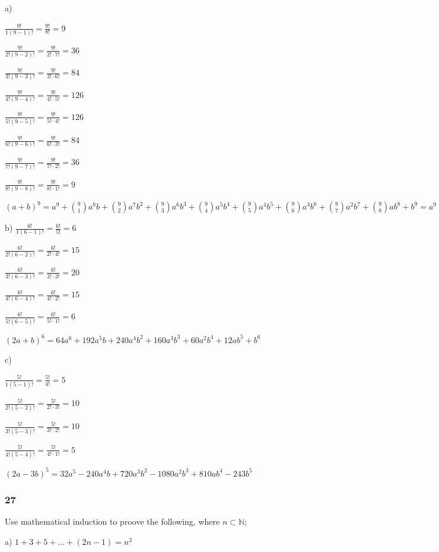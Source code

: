\documentclass[]{report}
\begin{document}
a)

$\frac{9!}{1(9-1)!} = \frac{9!}{8!} = 9$

$\frac{9!}{2!(9-2)!} = \frac{9!}{2! \cdot 7!} = 36$

$\frac{9!}{3!(9-3)!} = \frac{9!}{3! \cdot 6!} = 84$

$\frac{9!}{4!(9-4)!} = \frac{9!}{4! \cdot 5!} = 126$

$\frac{9!}{5!(9-5)!} = \frac{9!}{5! \cdot 4!} = 126$

$\frac{9!}{6!(9-6)!} = \frac{9!}{6! \cdot 3!} = 84$

$\frac{9!}{7!(9-7)!} = \frac{9!}{7! \cdot 2!} = 36$

$\frac{9!}{8!(9-8)!} = \frac{9!}{8! \cdot 1!} = 9$



 $(a+b)^9= a^9 + {9 \choose 1}a^8b + {9 \choose 2}a^7b^2 + {9 \choose 3}a^6b^3  +  {9 \choose 4}a^5b^4 + {9 \choose 5}a^4b^5+ {9 \choose 6}a^3b^6+ {9 \choose 7}a^2b^7+ {9 \choose 8}ab^8 +  b^9 = a^9 + 9a^8b + 36a^7b^2 + 84a^6b^3 +  126a^5b^4 + 126a^4b^5+ 84a^3b^6+ 36a^2b^7+ 9ab^8 +  b^9$

b) 
$\frac{6!}{1(6-1)!} = \frac{6!}{5!} = 6$

$\frac{6!}{2!(6-2)!} = \frac{6!}{2! \cdot 4!} = 15$

$\frac{6!}{3!(6-3)!} = \frac{6!}{3! \cdot 3!} = 20$

$\frac{6!}{4!(6-4)!} = \frac{6!}{4! \cdot 2!} = 15$

$\frac{6!}{5!(6-5)!} = \frac{6!}{5! \cdot 1!} = 6$

$(2a + b)^6  = 64a^6 + 192a^5b + 240a^4b^2 + 160a^3b^3 + 60a^2b^4 + 12ab^5 + b^6$

c) 

$\frac{5!}{1(5-1)!} = \frac{5!}{4!} = 5$

$\frac{5!}{2!(5-2)!} = \frac{5!}{2! \cdot 3!} = 10$

$\frac{5!}{3!(5-3)!} = \frac{5!}{3! \cdot 2!} = 10$

$\frac{5!}{4!(5-4)!} = \frac{5!}{4! \cdot 1!} = 5$

$(2a - 3b)^5 = 32a^5 -240a^4b + 720a^3b^2 - 1080a^2b^3 + 810ab^4 - 243b^5$

\subsubsection{27}

Use mathematical induction to proove the following, where $n \subset \mathbb{N}$;

a) $1 + 3 + 5 + ... + (2n-1) = n^2$
\end{document}
